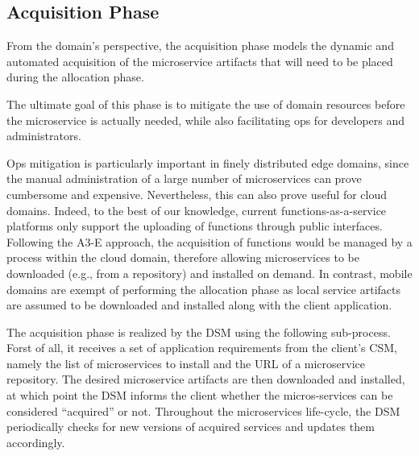 \subsection*{Acquisition Phase}\label{sec:A3-E-acquisition}


From the domain's perspective, the acquisition phase models the dynamic and automated acquisition of the microservice artifacts that will need to be placed during the allocation phase. %



The ultimate goal of this phase is to mitigate the use of domain resources before the microservice is actually needed, while also facilitating ops for developers and administrators. 

Ops mitigation is particularly important in finely distributed edge domains, since the manual administration of a large number of microservices can prove cumbersome and expensive. Nevertheless, this can also prove useful for cloud domains. Indeed, to the best of our knowledge, current functions-as-a-service platforms only support the uploading of functions through public interfaces. Following the A3-E approach, the acquisition of functions would be managed by a process within the cloud domain, therefore allowing microservices to be downloaded (e.g., from a repository) and installed on demand. In contrast, mobile domains are exempt of performing the allocation phase as local service artifacts are assumed to be downloaded and installed along with the client application.


The acquisition phase is realized by the DSM using the following sub-process. Forst of all, it receives a set of application requirements from the client's CSM, namely the list of microservices to install and the URL of a microservice repository. The desired microservice artifacts are then downloaded and installed, at which point the DSM informs the client whether the micros-services can be considered ``acquired'' or not. Throughout the microservices life-cycle, the DSM periodically checks for new versions of acquired services and updates them accordingly. 


